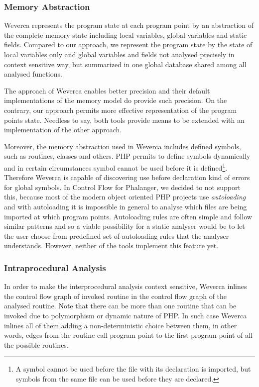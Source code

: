     \subsubsection*{Memory Abstraction}
    Weverca represents the program state at each program point by 
    an abstraction of the complete memory state including local 
    variables, global variables and static fields. Compared 
    to our approach, we represent the program state by the state 
    of local variables only and global variables and fields not 
    analysed precisely in context sensitive way, but summarized 
    in one global database shared among all analysed functions.
    
    The approach of Weverca enables better precision and 
    their default implementations of the memory model do 
    provide such precision. On the contrary, our approach 
    permits more effective representation of the program 
    points state. Needless to say, both tools provide means 
    to be extended with an implementation of the other 
    approach.
        
    Moreover, the memory abstraction used in Weverca includes 
    defined symbols, such as routines, classes and others. 
    PHP permits to define symbols dynamically and in certain circumstances 
    symbol cannot be used before it is defined\footnote{A symbol 
    cannot be used before the file with its declaration is imported, 
    but symbols from the same file can be used before they are declared.}. 
    Therefore Weverca is capable of discovering use before 
    declaration kind of errors for global symbols. In Control 
    Flow for Phalanger, we decided to not support this, 
    because most of the modern object oriented PHP projects 
    use \emph{autoloading} and with 
    autoloading it is impossible in general to analyse which 
    files are being imported at which program points. 
    Autoloading rules are often simple and follow 
    similar patterns and so a viable possibility for a static 
    analyser would be to let the user choose from predefined 
    set of autoloading rules that the analyser understands. 
    However, neither of the tools implement this feature yet.
    
    \subsubsection*{Intraprocedural Analysis}
    
    In order to make the interprocedural analysis context 
    sensitive, Weverca inlines the control flow graph of 
    invoked routine in the control flow graph of the 
    analysed routine. Note that there can be more than 
    one routine that can be invoked due to polymorphism 
    or dynamic nature of PHP. In such case Weverca 
    inlines all of them adding a non-deterministic choice 
    between them, in other words, edges from the routine call 
    program point to the first program point of all the 
    possible routines.
    
